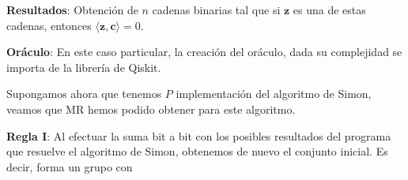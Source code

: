  \vspace{30pt}

 \textbf{Resultados}: Obtención de $n$ cadenas binarias tal que si $\mathbf{z}$ es una de estas cadenas, entonces $\langle \mathbf{z},\mathbf{c}\rangle = 0$.\newline

 \textbf{Oráculo}: En este caso particular, la creación del oráculo, dada su complejidad se importa de la librería de Qiskit.\newline

 Supongamos ahora que tenemos $P$ implementación del algoritmo de Simon, veamos que MR hemos podido obtener para este algoritmo.\newline

 \textbf{Regla I}: Al efectuar la suma bit a bit con los posibles resultados del programa que resuelve el algoritmo de Simon, obtenemos de nuevo el conjunto inicial. Es decir, forma un grupo con 



